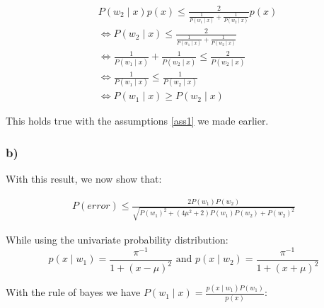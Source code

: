 \documentclass[10pt,a4paper]{article}
\begin{document}
\begin{align*}	
	&P(w_2 \mid x)p(x) \le \frac{2}{\frac{1}{P(w_1\mid x)} + \frac{1}{P(w_2 \mid x)}} p(x) \\
	&\Leftrightarrow P(w_2 \mid x) \le \frac{2}{\frac{1}{P(w_1\mid x)} + \frac{1}{P(w_2 \mid x)}} \\
	&\Leftrightarrow \frac{1}{P(w_1\mid x)} + \frac{1}{P(w_2 \mid x)} \le \frac{2}{P(w_2 \mid x)} \\
	&\Leftrightarrow \frac{1}{P(w_1 \mid x)} \le \frac{1}{P(w_2\mid x)} \\
	&\Leftrightarrow P(w_1 \mid x) \ge P(w_2\mid x)
\end{align*}

This holds true with the assumptions \ref{ass1} we made earlier.

\subsubsection*{b)}

With this result, we now show that:

\begin{align*}
P(error) \le \frac{2P(w_1)P(w_2)}{\sqrt{P(w_1)^2 + (4\mu^2 + 2)P(w_1)P(w_2) + P(w_2)^2}}
\end{align*}

While using the univariate probability distribution:
$$p(x\mid w_1) = \frac{\pi^{-1}}{1+ (x - \mu)^2} \textrm{ and } p(x \mid w_2) = \frac{\pi^{-1}}{1 + (x + \mu)^2}$$

With the rule of bayes we have $P(w_1 \mid x) = \frac{p(x \mid w_1)P(w_1)}{p(x)}$:
\end{document}
